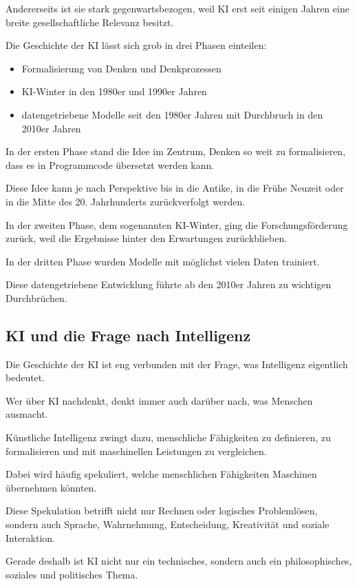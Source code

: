 Andererseits ist sie stark gegenwartsbezogen,
weil KI erst seit einigen Jahren
eine breite gesellschaftliche Relevanz besitzt.

Die Geschichte der KI lässt sich grob
in drei Phasen einteilen:

\begin{itemize}
\item Formalisierung von Denken und Denkprozessen
\item KI-Winter in den 1980er und 1990er Jahren
\item datengetriebene Modelle seit den 1980er Jahren mit Durchbruch in den 2010er Jahren
\end{itemize}

In der ersten Phase stand die Idee im Zentrum,
Denken so weit zu formalisieren,
dass es in Programmcode übersetzt werden kann.

Diese Idee kann je nach Perspektive
bis in die Antike,
in die Frühe Neuzeit
oder in die Mitte des 20. Jahrhunderts zurückverfolgt werden.

In der zweiten Phase,
dem sogenannten KI-Winter,
ging die Forschungsförderung zurück,
weil die Ergebnisse hinter den Erwartungen zurückblieben.

In der dritten Phase wurden Modelle
mit möglichst vielen Daten trainiert.

Diese datengetriebene Entwicklung
führte ab den 2010er Jahren
zu wichtigen Durchbrüchen.

\subsection{KI und die Frage nach Intelligenz}

Die Geschichte der KI ist eng verbunden
mit der Frage,
was Intelligenz eigentlich bedeutet.

Wer über KI nachdenkt,
denkt immer auch darüber nach,
was Menschen ausmacht.

Künstliche Intelligenz zwingt dazu,
menschliche Fähigkeiten zu definieren,
zu formalisieren
und mit maschinellen Leistungen zu vergleichen.

Dabei wird häufig spekuliert,
welche menschlichen Fähigkeiten
Maschinen übernehmen könnten.

Diese Spekulation betrifft nicht nur Rechnen
oder logisches Problemlösen,
sondern auch Sprache,
Wahrnehmung,
Entscheidung,
Kreativität
und soziale Interaktion.

Gerade deshalb ist KI nicht nur ein technisches,
sondern auch ein philosophisches,
soziales und politisches Thema.

